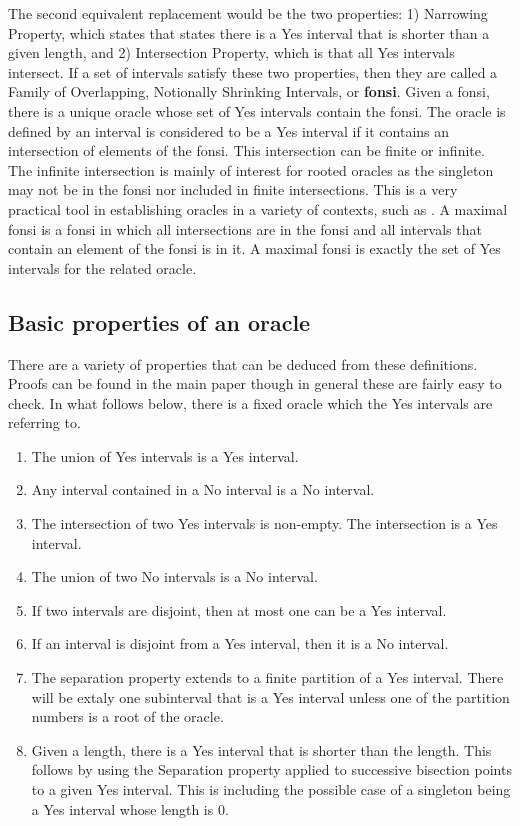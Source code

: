 \documentclass[12pt]{article}
\theoremstyle{remark}
\begin{document}
The second equivalent replacement would be the two properties: 1) Narrowing Property, which states that states there is a Yes interval that is shorter than a given length, and 2) Intersection Property, which is that all Yes intervals intersect. If a set of intervals satisfy these two properties, then they are called a Family of Overlapping, Notionally Shrinking Intervals, or \textbf{fonsi}. Given a fonsi, there is a unique oracle whose set of Yes intervals contain the fonsi. The oracle is defined by an interval is considered to be a Yes interval if it contains an intersection of elements of the fonsi. This intersection can be finite or infinite. The infinite intersection is mainly of interest for rooted oracles as the singleton may not be in the fonsi nor included in finite intersections. This is a very practical tool in establishing oracles in a variety of contexts, such as . A maximal fonsi is a fonsi in which all intersections are in the fonsi and all intervals that contain an element of the fonsi is in it. A maximal fonsi is exactly the set of Yes intervals for the related oracle. 


\subsection{Basic properties of an oracle}

There are a variety of properties that can be deduced from these definitions. Proofs can be found in the main paper though in general these are fairly easy to check. In what follows below, there is a fixed oracle which the Yes intervals are referring to.

\begin{enumerate}
    \item The union of Yes intervals is a Yes interval. 
    \item Any interval contained in a No interval is a No interval. 
    \item The intersection of two Yes intervals is non-empty. The intersection is a Yes interval. 
    \item The union of two No intervals is a No interval. 
    \item If two intervals are disjoint, then at most one can be a Yes interval. 
    \item If an interval is disjoint from a Yes interval, then it is a No interval. 
    \item The separation property extends to a finite partition of a Yes interval. There will be extaly one subinterval that is a Yes interval unless one of the partition numbers is a root of the oracle.   
    \item Given a length, there is a Yes interval that is shorter than the length. This follows by using the Separation property applied to successive bisection points to a given Yes interval. This is including the possible case of a singleton being a Yes interval whose length is 0. 
\end{enumerate}
\end{document}
